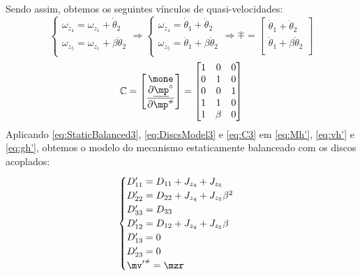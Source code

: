 \documentclass[a4paper,11pt,brazil,fleqn]{article}
\begin{document}
Sendo assim, obtemos os seguintes v\'{i}nculos de quasi-velocidades:
\begin{equation}\label{eq:Quasi-velocitiesConstraints3}
\begin{cases}
\omega_{z_4} = \omega_{z_1} + \dot{\theta}_2 \\
\omega_{z_5} = \omega_{z_1} + \beta\dot{\theta}_2 \\
\end{cases}
\Rightarrow
\begin{cases}
\omega_{z_4} = \dot{\theta}_1 + \dot{\theta}_2 \\
\omega_{z_5} = \dot{\theta}_1 + \beta\dot{\theta}_2 \\
\end{cases}
\Rightarrow
\overline{\mp} = 
\begin{bmatrix}
\dot{\theta}_1 + \dot{\theta}_2 \\
\dot{\theta}_1 + \beta\dot{\theta}_2 \\
\end{bmatrix}
\end{equation}
\begin{equation}\label{eq:C3}
\mC =
\begin{bmatrix}
\mone \\
\displaystyle\frac{\partial \underline{\mp}^\circ}{\partial \mp\ssh}
\end{bmatrix}  =
\begin{bmatrix}
1 & 0 & 0 \\
0 & 1 & 0 \\
0 & 0 & 1 \\
1 & 1     & 0 \\
1 & \beta & 0 \\
\end{bmatrix} 
\end{equation}
Aplicando \eqref{eq:StaticBalanced3}, \eqref{eq:DiscsModel3} e \eqref{eq:C3} em \eqref{eq:Mh'}, \eqref{eq:vh'} e \eqref{eq:gh'}, obtemos o modelo do mecanismo estaticamente balanceado com os discos acoplados:
\begin{equation}\label{eq:CoupledDynamics3}
\begin{cases}
D'_{11} = D_{11} + J_{z_4} + J_{z_5} \\
D'_{22} = D_{22} + J_{z_4} + J_{z_5} \beta^2 \\
D'_{33} = D_{33} \\
D'_{12} = D_{12} + J_{z_4} + J_{z_5} \beta \\
D'_{13} = 0 \\
D'_{23} = 0\\
{\mv'}\ssh = \mzr \\
\end{cases}
\end{equation}
\end{document}
